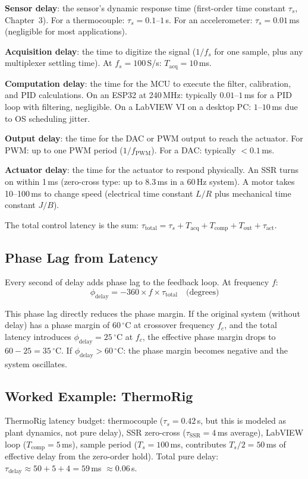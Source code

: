 \documentclass[11pt,letterpaper,twoside,openany]{book}
\newcommand{\degC}{\ensuremath{{}^{\circ}\text{C}}}
\begin{document}
\textbf{Sensor delay}: the sensor's dynamic response time (first-order time constant $\tau_s$, Chapter~3). For a thermocouple: $\tau_s = 0.1$--$1$\,s. For an accelerometer: $\tau_s = 0.01$\,ms (negligible for most applications).

\textbf{Acquisition delay}: the time to digitize the signal ($1/f_s$ for one sample, plus any multiplexer settling time). At $f_s = 100$\,S/s: $T_{\text{acq}} = 10$\,ms.

\textbf{Computation delay}: the time for the MCU to execute the filter, calibration, and PID calculations. On an ESP32 at 240\,MHz: typically $0.01$--$1$\,ms for a PID loop with filtering, negligible. On a LabVIEW VI on a desktop PC: $1$--$10$\,ms due to OS scheduling jitter.

\textbf{Output delay}: the time for the DAC or PWM output to reach the actuator. For PWM: up to one PWM period ($1/f_{\text{PWM}}$). For a DAC: typically $< 0.1$\,ms.

\textbf{Actuator delay}: the time for the actuator to respond physically. An SSR turns on within 1\,ms (zero-cross type: up to 8.3\,ms in a 60\,Hz system). A motor takes 10--100\,ms to change speed (electrical time constant $L/R$ plus mechanical time constant $J/B$).

The total control latency is the sum: $\tau_{\text{total}} = \tau_s + T_{\text{acq}} + T_{\text{comp}} + T_{\text{out}} + \tau_{\text{act}}$.

\subsection{Phase Lag from Latency}
Every second of delay adds phase lag to the feedback loop. At frequency $f$:
\begin{equation}
\phi_{\text{delay}} = -360 \times f \times \tau_{\text{total}} \quad \text{(degrees)}
\end{equation}

This phase lag directly reduces the phase margin. If the original system (without delay) has a phase margin of 60\,\degC{} at crossover frequency $f_c$, and the total latency introduces $\phi_{\text{delay}} = 25$\,\degC{} at $f_c$, the effective phase margin drops to $60 - 25 = 35$\,\degC{}. If $\phi_{\text{delay}} > 60$\,\degC{}: the phase margin becomes negative and the system oscillates.

\subsection{Worked Example: ThermoRig}
ThermoRig latency budget: thermocouple ($\tau_s = 0.42$\,s, but this is modeled as plant dynamics, not pure delay), SSR zero-cross ($\tau_{\text{SSR}} = 4$\,ms average), LabVIEW loop ($T_{\text{comp}} = 5$\,ms), sample period ($T_s = 100$\,ms, contributes $T_s/2 = 50$\,ms of effective delay from the zero-order hold). Total pure delay: $\tau_{\text{delay}} \approx 50 + 5 + 4 = 59$\,ms $\approx 0.06$\,s.
\end{document}
